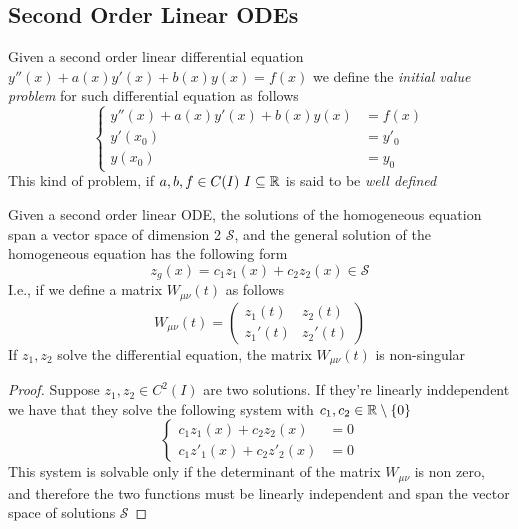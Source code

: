 \documentclass[../complete.tex]{subfiles}
\begin{document}
\subsection{Second Order Linear ODEs}
\begin{dfn}
	Given a second order linear differential equation $y''(x)+a(x)y'(x)+b(x)y(x)=f(x)$ we define the \textit{initial value problem} for such differential equation as follows
	\begin{equation*}
		\left\{ \begin{aligned}
				y''(x)+a(x)y'(x)+b(x)y(x)&=f(x)\\
				y'(x_0)&=y'_0\\
				y(x_0)&=y_0
		\end{aligned}\right.
	\end{equation*}
	This kind of problem, if $a,b,f\in C(I)\ I\subseteq\R$ is said to be \textit{well defined}
\end{dfn}
\begin{thm}
	Given a second order linear ODE, the solutions of the homogeneous equation span a vector space of dimension 2 $\mathcal{S}$, and the general solution of the homogeneous equation has the following form
	\begin{equation*}
		z_g(x)=c_1z_1(x)+c_2z_2(x)\in\mathcal{S}
	\end{equation*}
	I.e., if we define a matrix $W_{\mu\nu}(t)$ as follows
	\begin{equation*}
		W_{\mu\nu}(t)=\begin{pmatrix}z_1(t)&z_2(t)\\z_1'(t)&z_2'(t)\end{pmatrix}
	\end{equation*}
	If $z_1,z_2$ solve the differential equation, the matrix $W_{\mu\nu}(t)$ is non-singular
\end{thm}
\begin{proof}
	Suppose $z_1,z_2\in C^2(I)$ are two solutions. If they're linearly inddependent we have that they solve the following system with $c_1,c_2\in\mathbb{R}\setminus\{0\}$
	\begin{equation*}
		\left\{ \begin{aligned}
				c_1z_1(x)+c_2z_2(x)&=0\\
				c_1z'_1(x)+c_2z'_2(x)&=0
		\end{aligned}\right.
	\end{equation*}
	This system is solvable only if the determinant of the matrix $W_{\mu\nu}$ is non zero, and therefore the two functions must be linearly independent and span the vector space of solutions $\mathcal{S}$
\end{proof}
\end{document}
